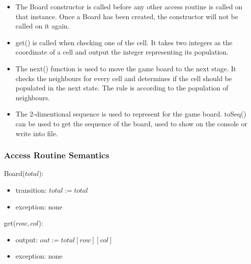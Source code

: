 \documentclass[12pt]{article}
\begin{document}
\begin{itemize}
\item The Board constructor is called before any other
access routine is called on that instance. Once a Board has been created, the constructor will not be called on it again.

\item get() is called when checking one of the cell. It takes two integers as the coordinate of a cell and output the integer representing its population.

\item The next() function is used to move the game board to the next stage. It checks the neighbours for every cell and determines if the cell should be populated in the next state. The rule is according to the population of neighbours.

\item The 2-dimentional sequence is used to represent for the game board. toSeq() can be used to get the sequence of the board, used to show on the console or write into file.
\end{itemize}

\subsubsection* {Access Routine Semantics}



\noindent Board($total$):
\begin{itemize}
\item transition: $total := total$
\item exception: none
\end{itemize}

\noindent get($row, col$):
\begin{itemize}
\item output:
$out := total[row][col]$
\item exception: none
\end{itemize}
\end{document}
